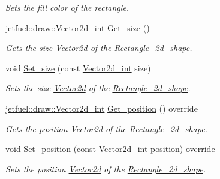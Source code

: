 \begin{DoxyCompactItemize}
\begin{DoxyCompactList}\small\item\em Sets the fill color of the rectangle. \end{DoxyCompactList}\item 
\hyperlink{classjetfuel_1_1draw_1_1Vector2d}{jetfuel\+::draw\+::\+Vector2d\+\_\+int} \hyperlink{classjetfuel_1_1draw_1_1Rectangle__2d__shape_ace7c296b14b0ad8f15e6ed1115000b1e}{Get\+\_\+size} ()
\begin{DoxyCompactList}\small\item\em Gets the size \hyperlink{classjetfuel_1_1draw_1_1Vector2d}{Vector2d} of the \hyperlink{classjetfuel_1_1draw_1_1Rectangle__2d__shape}{Rectangle\+\_\+2d\+\_\+shape}. \end{DoxyCompactList}\item 
void \hyperlink{classjetfuel_1_1draw_1_1Rectangle__2d__shape_a27f242564a455d5cd7274e50e5156ffc}{Set\+\_\+size} (const \hyperlink{classjetfuel_1_1draw_1_1Vector2d}{Vector2d\+\_\+int} size)
\begin{DoxyCompactList}\small\item\em Sets the size \hyperlink{classjetfuel_1_1draw_1_1Vector2d}{Vector2d} of the \hyperlink{classjetfuel_1_1draw_1_1Rectangle__2d__shape}{Rectangle\+\_\+2d\+\_\+shape}. \end{DoxyCompactList}\item 
\hyperlink{classjetfuel_1_1draw_1_1Vector2d}{jetfuel\+::draw\+::\+Vector2d\+\_\+int} \hyperlink{classjetfuel_1_1draw_1_1Rectangle__2d__shape_a60aa3e0fa050e3fbd98177c1eef721b0}{Get\+\_\+position} () override
\begin{DoxyCompactList}\small\item\em Gets the position \hyperlink{classjetfuel_1_1draw_1_1Vector2d}{Vector2d} of the \hyperlink{classjetfuel_1_1draw_1_1Rectangle__2d__shape}{Rectangle\+\_\+2d\+\_\+shape}. \end{DoxyCompactList}\item 
void \hyperlink{classjetfuel_1_1draw_1_1Rectangle__2d__shape_a375b0892589ef7cd1762576e9ce96875}{Set\+\_\+position} (const \hyperlink{classjetfuel_1_1draw_1_1Vector2d}{Vector2d\+\_\+int} position) override
\begin{DoxyCompactList}\small\item\em Sets the position \hyperlink{classjetfuel_1_1draw_1_1Vector2d}{Vector2d} of the \hyperlink{classjetfuel_1_1draw_1_1Rectangle__2d__shape}{Rectangle\+\_\+2d\+\_\+shape}. \end{DoxyCompactList}\item 

\end{DoxyCompactItemize}
